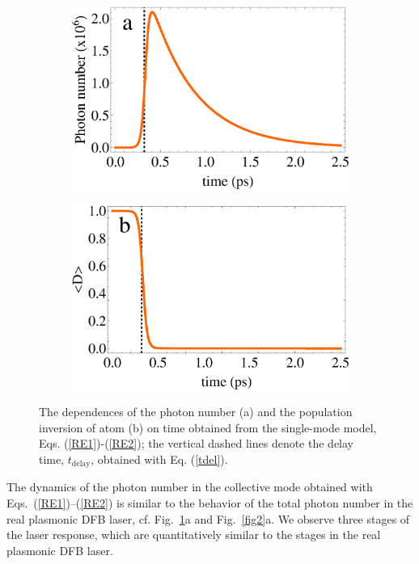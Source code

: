 \documentclass[aps,pra,amsmath,amssymb,onecolumn,superscriptaddress,showpacs,floatfix,]{revtex4-1}
\begin{document}
\begin{figure}[h]
	\centering
	\begin{subfigure}[h]{0.45\linewidth}
		\includegraphics[width=\linewidth]{Fig4a.eps}
	\end{subfigure}
	\begin{subfigure}[h!]{0.45\linewidth}
		\includegraphics[width=\linewidth]{Fig4b.eps}
	\end{subfigure}
	\caption{The dependences of the photon number (a) and the population inversion of atom (b) on time obtained from the single-mode model, Eqs. (\ref{RE1})-(\ref{RE2}); the vertical dashed lines denote the delay time, $t_{\text{delay}}$, obtained with Eq. (\ref{tdel}).
	}
	\label{fig4}
\end{figure}

The dynamics of the photon number in the collective mode obtained with Eqs.~(\ref{RE1})--(\ref{RE2}) is similar to the behavior of the total photon number in the real plasmonic DFB laser, cf.  Fig.~\ref{fig4}a and Fig.~\ref{fig2}a.
We observe three stages of the laser response, which are quantitatively similar to the stages in the real plasmonic DFB laser.
\end{document}
